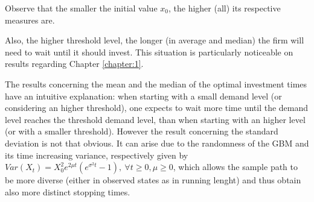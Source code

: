 Observe that the smaller the initial value $x_0$, the higher (all) its respective measures are. 

Also, the higher threshold level, the longer (in average and median) the firm will need to wait until it should invest. This situation is particularly noticeable on results regarding Chapter \ref{chapter:1}.

The results concerning the mean and the median of the optimal investment times have an intuitive explanation: when starting with a small demand level (or considering an higher threshold), one expects to wait more time until the demand level reaches the threshold demand level, than when starting with an higher level (or with a smaller threshold). However the result concerning the standard deviation is not that obvious. It can arise due to the randomness of the GBM and its time increasing variance, respectively given by $Var(X_t)=X_0^2 e^{2\mu t}(e^{\sigma^2 t} -1), \ \forall t\geq0, \mu \geq 0$, which allows the sample path to be more diverse (either in observed states as in running lenght) and thus obtain also more distinct stopping times.
\pagebreak

